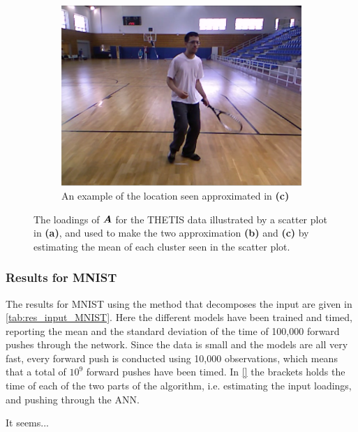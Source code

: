 \begin{figure}
\begin{subfigure}{.45\linewidth}
        \captionsetup{width=.95\linewidth}
        \includegraphics[width=.78\linewidth]{Pics/06_results/loc_2_real.png}
        \caption{An example of the location seen approximated in \textbf{(c)}}
    \end{subfigure}
    \caption{The loadings of $\boldsymbol{A}$ for the THETIS data illustrated by a scatter plot in \textbf{(a)}, and used to make the two approximation \textbf{(b)} and \textbf{(c)} by estimating the mean of each cluster seen in the scatter plot.}
    \label{fig:scatter_plot_THETIS}
\end{figure}

\subsubsection{Results for MNIST}
The results for MNIST using the method that decomposes the input are given in \autoref{tab:res_input_MNIST}. Here the different models have been trained and timed, reporting the mean and the standard deviation of the time of 100,000 forward pushes through the network. Since the data is small and the models are all very fast, every forward push is conducted using 10,000 observations, which means that a total of $10^{9}$ forward pushes have been timed. In \autoref{} the brackets holds the time of each of the two parts of the algorithm, i.e. estimating the input loadings, and pushing through the ANN. 

It seems... 

